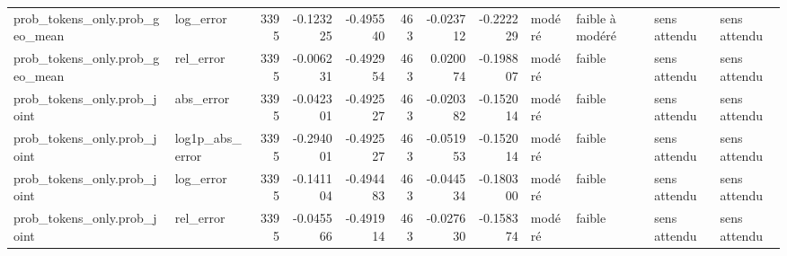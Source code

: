 \begin{longtable}{llrrrrrrllll}
prob_tokens_only.prob_geo_mean & log_error & 3395 & -0.123225 & -0.495540 & 463 & -0.023712 & -0.222229 & modéré & faible à modéré & sens attendu & sens attendu \\
prob_tokens_only.prob_geo_mean & rel_error & 3395 & -0.006231 & -0.492954 & 463 & 0.020074 & -0.198807 & modéré & faible & sens attendu & sens attendu \\
prob_tokens_only.prob_joint & abs_error & 3395 & -0.042301 & -0.492527 & 463 & -0.020382 & -0.152014 & modéré & faible & sens attendu & sens attendu \\
prob_tokens_only.prob_joint & log1p_abs_error & 3395 & -0.294001 & -0.492527 & 463 & -0.051953 & -0.152014 & modéré & faible & sens attendu & sens attendu \\
prob_tokens_only.prob_joint & log_error & 3395 & -0.141104 & -0.494483 & 463 & -0.044534 & -0.180300 & modéré & faible & sens attendu & sens attendu \\
prob_tokens_only.prob_joint & rel_error & 3395 & -0.045566 & -0.491914 & 463 & -0.027630 & -0.158374 & modéré & faible & sens attendu & sens attendu \\
\end{longtable}
